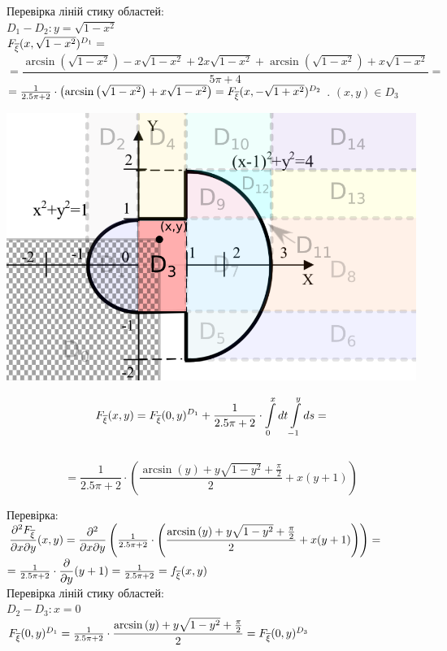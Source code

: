 \documentclass[14pt,a4paper]{scrartcl}
\theoremstyle{definition}
\theoremstyle{remark}
\theoremstyle{definition}
\theoremstyle{definition}
\begin{document}
Перевірка ліній стику областей:\\
$D_1 - D_2: y = \sqrt{1- x^2}$\\
$ F_{\overline{\xi}} (x,\sqrt{1- x^2})^{D_1} = $\\
$=\dfrac{\arcsin\left(\sqrt{1-x^2}\right)-x\sqrt{1-x^2}+2x\sqrt{1-x^2}+\arcsin\left(\sqrt{1-x^2}\right)+x\sqrt{1-x^2}}{5\pi + 4} =$
\\$= \frac{1}{2.5\pi + 2} \cdot \left( \arcsin\left(\sqrt{1-x^2}\right)+x\sqrt{1-x^2} \right)  =F_{\overline{\xi}} (x,-\sqrt{1+x^2})^{D_2}$
. $(x,y) \in D_3$
\begin{center} \includegraphics[scale=0.4]{assets/zone43.png} \end{center}
$$
F_{\overline{\xi}} (x,y) =  F_{\overline{\xi}} (0,y)^{D_1}+ \frac{1}{2.5\pi + 2} \cdot  \int\limits_{0}^{ x}{dt  \int\limits_{-1}^{y }{ds}} =$$\\$$= \frac{1}{2.5\pi + 2} \cdot \left( \dfrac{\arcsin\left(y\right)+y\sqrt{1-y^2} + \frac{\pi}{2} }{2}+ x(y+1)\right)
$$

Перевірка:\\
$\dfrac{\partial^2 F_{\overline{\xi}}}{\partial x \partial y}(x,y) = \dfrac{\partial^2}{\partial x \partial y} \left(\frac{1}{2.5\pi + 2} \cdot \left( \dfrac{\arcsin\left(y\right)+y\sqrt{1-y^2} + \frac{\pi}{2} }{2}+ x(y+1)\right) \right) =$\\
$ = \frac{1}{2.5\pi + 2} \cdot \dfrac{\partial}{\partial y} (y+1) = \frac{1}{2.5\pi + 2} =f_{\overline{\xi}} (x,y)$\\

Перевірка ліній стику областей:\\
$D_2 - D_3: x = 0$\\
$ F_{\overline{\xi}} (0,y)^{D_1} =\frac{1}{2.5\pi + 2} \cdot\dfrac{\arcsin\left(y\right)+y\sqrt{1-y^2} + \frac{\pi}{2} }{2} =F_{\overline{\xi}} (0,y)^{D_3}$
\end{document}
